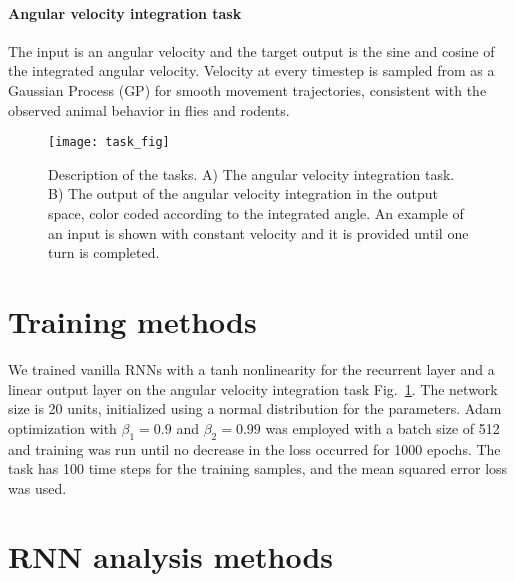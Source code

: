 \documentclass{article} %
\newcounter{ct}
\theoremstyle{definition}
\theoremstyle{remark}
\begin{document}
\paragraph{Angular velocity integration task}
The input is an angular velocity and the target output is the sine and cosine of the integrated angular velocity.
Velocity at every timestep  is sampled from as a Gaussian Process (GP) for smooth movement trajectories, consistent with the observed animal behavior in flies and rodents.
 
 
 \begin{figure}[tbhp]
     \centering
    \texttt{[image: task\_fig]}
       \caption{Description of the tasks. A) The angular velocity integration task. B) The output of the angular velocity integration in the output space, color coded according to the integrated angle. An example of an input is shown with constant velocity and it is provided until one turn is completed.}
         \label{fig:angular_task}
\end{figure}

 
 
 
 
 \section{Training methods}
 
 We trained vanilla RNNs with a tanh nonlinearity for the recurrent layer and a linear output layer on the angular velocity integration task Fig.~\ref{fig:angular_task}.
 The network size is 20 units, initialized using a normal distribution for the parameters.
  Adam optimization with $\beta_1=0.9$ and $\beta_2=0.99$ was employed with a batch size of 512 and training was run until no decrease in the loss occurred for 1000 epochs.
   The task has 100 time steps for the training samples, and the mean squared error loss was used.



 \section{RNN analysis methods}
 
 
 

\end{document}

